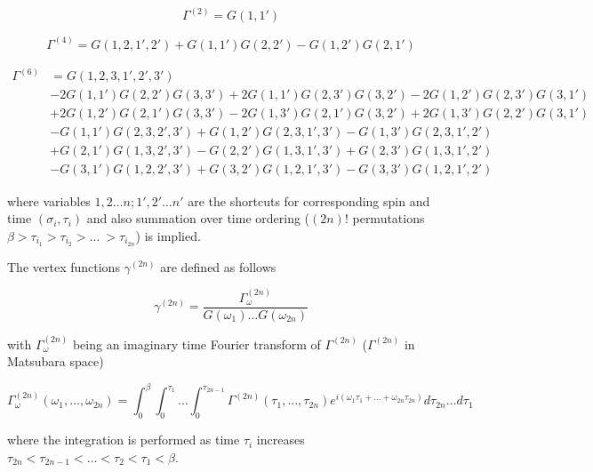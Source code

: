 \begin{equation} \Gamma^{(2)} = G(1, 1') \end{equation}

\begin{equation} \Gamma^{(4)} = G(1,2,1',2')+G(1,1')G(2,2')-G(1,2')G(2,1')\end{equation}

\begin{equation}\begin{aligned}
\Gamma^{(6)} & = G(1, 2, 3, 1', 2', 3') \\
& -2 G(1, 1') G(2, 2') G(3, 3') 
+2 G(1, 1') G(2, 3') G(3, 2')
-2 G(1, 2') G(2, 3') G(3, 1') \\ 
& +2 G(1, 2') G(2, 1') G(3, 3')
-2 G(1, 3') G(2, 1') G(3, 2')
+2 G(1, 3') G(2, 2') G(3, 1') \\
& -G(1, 1') G(2, 3, 2', 3')
+G(1, 2') G(2, 3, 1', 3')
-G(1, 3') G(2, 3, 1', 2') \\
& +G(2, 1') G(1, 3, 2', 3')
-G(2, 2') G(1, 3, 1', 3')
+G(2, 3') G(1, 3, 1', 2') \\
& -G(3, 1') G(1, 2, 2', 3')
+G(3, 2') G(1, 2, 1', 3')
-G(3, 3') G(1, 2, 1', 2')
\end{aligned}\end{equation}

where variables $1,2\dots n;1',2'\dots n'$ are the shortcuts for corresponding spin and time $(\sigma_i,\tau_i)$
 and also summation over time ordering ($(2n)!$ permutations $\beta>\tau_{i_1}>\tau_{i_2}>\dots\ >\tau_{i_{2n}}$) is implied.

The vertex functions $\gamma^{(2n)}$ are defined as follows

\begin{equation} \gamma^{(2n)} = \frac{\Gamma_\omega^{(2n)}}{G(\omega_1)\dots G(\omega_{2n})} \end{equation}

with $\Gamma_\omega^{(2n)}$ being an imaginary time Fourier transform of $\Gamma^{(2n)}$ ($\Gamma^{(2n)}$ in Matsubara space)

\begin{equation}
  \Gamma_\omega^{(2n)}(\omega_1,\dots,\omega_{2n}) = \int_0^\beta\int_0^{\tau_1}\dots\int_0^{\tau_{2n-1}}\Gamma^{(2n)}(\tau_1,\dots,\tau_{2n})e^{i(\omega_1\tau_1+\dots+\omega_{2n}\tau_{2n})}d\tau_{2n}\dots d\tau_1
\end{equation}

where the integration is performed as time $\tau_i$ increases $\tau_{2n}<\tau_{2n-1}<\dots<\tau_2<\tau_1<\beta$.

